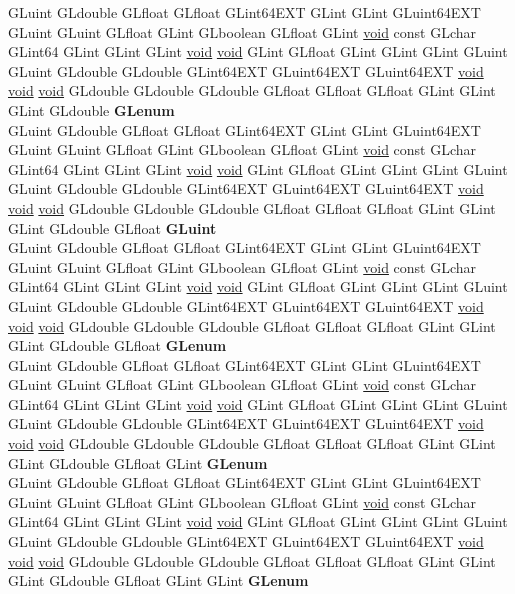 \begin{DoxyCompactItemize}
\begin{tabbing}
\>GLuint GLdouble GLfloat GLfloat GLint64EXT GLint GLint GLuint64EXT GLuint GLuint GLfloat GLint GLboolean GLfloat GLint \hyperlink{interfacevoid}{void} const GLchar GLint64 GLint GLint GLint \hyperlink{interfacevoid}{void} \hyperlink{interfacevoid}{void} GLint GLfloat GLint GLint GLint GLuint GLuint GLdouble GLdouble GLint64EXT GLuint64EXT GLuint64EXT \hyperlink{interfacevoid}{void} \hyperlink{interfacevoid}{void} \hyperlink{interfacevoid}{void} GLdouble GLdouble GLdouble GLfloat GLfloat GLfloat GLint GLint GLint GLdouble {\bfseries GLenum}\\
\>GLuint GLdouble GLfloat GLfloat GLint64EXT GLint GLint GLuint64EXT GLuint GLuint GLfloat GLint GLboolean GLfloat GLint \hyperlink{interfacevoid}{void} const GLchar GLint64 GLint GLint GLint \hyperlink{interfacevoid}{void} \hyperlink{interfacevoid}{void} GLint GLfloat GLint GLint GLint GLuint GLuint GLdouble GLdouble GLint64EXT GLuint64EXT GLuint64EXT \hyperlink{interfacevoid}{void} \hyperlink{interfacevoid}{void} \hyperlink{interfacevoid}{void} GLdouble GLdouble GLdouble GLfloat GLfloat GLfloat GLint GLint GLint GLdouble GLfloat {\bfseries GLuint}\\
\>GLuint GLdouble GLfloat GLfloat GLint64EXT GLint GLint GLuint64EXT GLuint GLuint GLfloat GLint GLboolean GLfloat GLint \hyperlink{interfacevoid}{void} const GLchar GLint64 GLint GLint GLint \hyperlink{interfacevoid}{void} \hyperlink{interfacevoid}{void} GLint GLfloat GLint GLint GLint GLuint GLuint GLdouble GLdouble GLint64EXT GLuint64EXT GLuint64EXT \hyperlink{interfacevoid}{void} \hyperlink{interfacevoid}{void} \hyperlink{interfacevoid}{void} GLdouble GLdouble GLdouble GLfloat GLfloat GLfloat GLint GLint GLint GLdouble GLfloat {\bfseries GLenum}\\
\>GLuint GLdouble GLfloat GLfloat GLint64EXT GLint GLint GLuint64EXT GLuint GLuint GLfloat GLint GLboolean GLfloat GLint \hyperlink{interfacevoid}{void} const GLchar GLint64 GLint GLint GLint \hyperlink{interfacevoid}{void} \hyperlink{interfacevoid}{void} GLint GLfloat GLint GLint GLint GLuint GLuint GLdouble GLdouble GLint64EXT GLuint64EXT GLuint64EXT \hyperlink{interfacevoid}{void} \hyperlink{interfacevoid}{void} \hyperlink{interfacevoid}{void} GLdouble GLdouble GLdouble GLfloat GLfloat GLfloat GLint GLint GLint GLdouble GLfloat GLint {\bfseries GLenum}\\
\>GLuint GLdouble GLfloat GLfloat GLint64EXT GLint GLint GLuint64EXT GLuint GLuint GLfloat GLint GLboolean GLfloat GLint \hyperlink{interfacevoid}{void} const GLchar GLint64 GLint GLint GLint \hyperlink{interfacevoid}{void} \hyperlink{interfacevoid}{void} GLint GLfloat GLint GLint GLint GLuint GLuint GLdouble GLdouble GLint64EXT GLuint64EXT GLuint64EXT \hyperlink{interfacevoid}{void} \hyperlink{interfacevoid}{void} \hyperlink{interfacevoid}{void} GLdouble GLdouble GLdouble GLfloat GLfloat GLfloat GLint GLint GLint GLdouble GLfloat GLint GLint {\bfseries GLenum}\\

\end{tabbing}
\end{DoxyCompactItemize}
